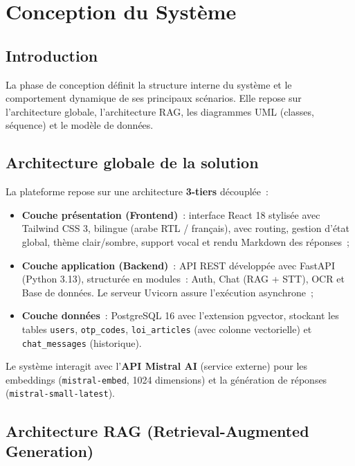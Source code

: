 \documentclass[12pt,a4paper]{report}
\begin{document}
\chapter{Conception du Système}
\label{chap:conception}

\section{Introduction}

La phase de conception définit la structure interne du système et le comportement dynamique de ses principaux scénarios. Elle repose sur l'architecture globale, l'architecture RAG, les diagrammes UML (classes, séquence) et le modèle de données.

\section{Architecture globale de la solution}

La plateforme repose sur une architecture \textbf{3-tiers} découplée~:

\begin{itemize}[label=\textbullet]
    \item \textbf{Couche présentation (Frontend)}~: interface React 18 stylisée avec Tailwind CSS 3, bilingue (arabe RTL / français), avec routing, gestion d'état global, thème clair/sombre, support vocal et rendu Markdown des réponses~;
    \item \textbf{Couche application (Backend)}~: API REST développée avec FastAPI (Python 3.13), structurée en modules~: Auth, Chat (RAG + STT), OCR et Base de données. Le serveur Uvicorn assure l'exécution asynchrone~;
    \item \textbf{Couche données}~: PostgreSQL 16 avec l'extension pgvector, stockant les tables \texttt{users}, \texttt{otp\_codes}, \texttt{loi\_articles} (avec colonne vectorielle) et \texttt{chat\_messages} (historique).
\end{itemize}

Le système interagit avec l'\textbf{API Mistral AI} (service externe) pour les embeddings (\texttt{mistral-embed}, 1024 dimensions) et la génération de réponses (\texttt{mistral-small-latest}).

\section{Architecture RAG (Retrieval-Augmented Generation)}
\label{sec:rag}
\end{document}
